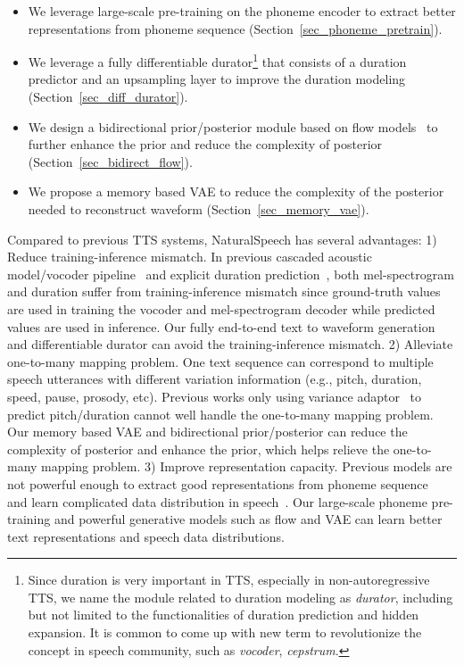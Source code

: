 \documentclass{article}
\theoremstyle{definition}
\def\myname{NaturalSpeech}
\begin{document}
\begin{itemize}[leftmargin=*]
\item We leverage large-scale pre-training on the phoneme encoder to extract better representations from phoneme sequence (Section~\ref{sec_phoneme_pretrain}).  

\item We leverage a fully differentiable durator\footnote{Since duration is very important in TTS, especially in non-autoregressive TTS, we name the module related to duration modeling as \textit{durator}, including but not limited to the functionalities of duration prediction and hidden expansion. It is common to come up with new term to revolutionize the concept in speech community, such as \textit{vocoder}, \textit{cepstrum}.} that consists of a duration predictor and an upsampling layer to improve the duration modeling (Section~\ref{sec_diff_durator}). 

\item We design a bidirectional prior/posterior module based on flow models~\cite{dinh2014nice,kingma2016improved,kingma2018glow} to further enhance the prior  and reduce the complexity of posterior  (Section~\ref{sec_bidirect_flow}).

\item We propose a memory based VAE to reduce the complexity of the posterior needed to reconstruct waveform (Section~\ref{sec_memory_vae}). 

\end{itemize}

Compared to previous TTS systems, \myname{} has several advantages: 1) Reduce training-inference mismatch. In previous cascaded acoustic model/vocoder pipeline~\citep{kim2020glow,ren2021fastspeech,popov2021grad} and explicit duration prediction~\citep{kim2020glow,kim2021conditional,ren2021fastspeech}, both mel-spectrogram and duration suffer from training-inference mismatch since ground-truth values are used in training the vocoder and mel-spectrogram decoder while predicted values are used in inference. Our fully end-to-end text to waveform generation and differentiable durator can avoid the training-inference mismatch. 2) Alleviate one-to-many mapping problem. One text sequence can correspond to multiple speech utterances with different variation information (e.g., pitch, duration, speed, pause, prosody, etc). Previous works only using variance adaptor~\citep{ren2021fastspeech,liu2021delightfultts} to predict pitch/duration cannot well handle the one-to-many mapping problem. Our memory based VAE and bidirectional prior/posterior can reduce the complexity of posterior and enhance the prior, which helps relieve the one-to-many mapping problem. 3) Improve representation capacity. Previous models are not powerful enough to extract good representations from phoneme sequence~\citep{kim2020glow,kim2021conditional,popov2021grad} and learn complicated data distribution in speech~\citep{ren2021fastspeech}. Our large-scale phoneme pre-training and powerful generative models such as flow and VAE can learn better text representations and speech data distributions. 
\end{document}
